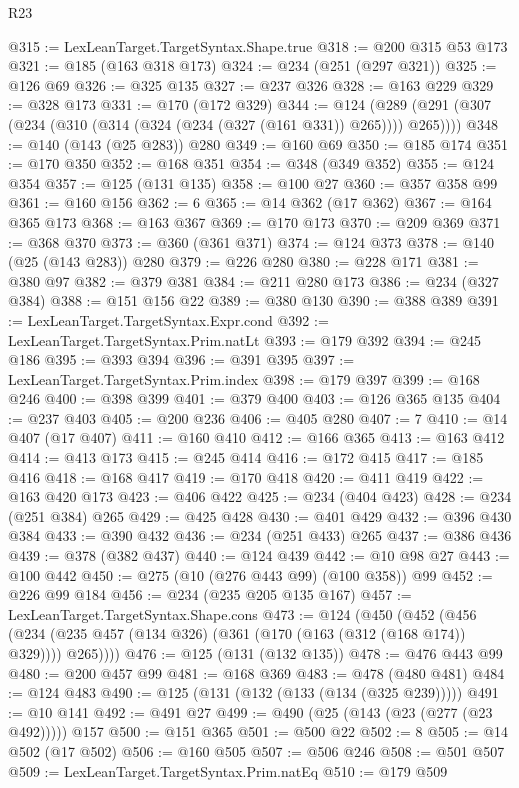 \begin{lexlean}{R23}
\begin{coremodule}
@315 := LexLeanTarget.TargetSyntax.Shape.true
@318 := @200 @315 @53 @173
@321 := @185 (@163 @318 @173)
@324 := @234 (@251 (@297 @321))
@325 := @126 @69
@326 := @325 @135
@327 := @237 @326
@328 := @163 @229
@329 := @328 @173
@331 := @170 (@172 @329)
@344 := @124 (@289 (@291 (@307 (@234 (@310 (@314 (@324 (@234 (@327 (@161 @331)) @265)))) @265))))
@348 := @140 (@143 (@25 @283)) @280
@349 := @160 @69
@350 := @185 @174
@351 := @170 @350
@352 := @168 @351
@354 := @348 (@349 @352)
@355 := @124 @354
@357 := @125 (@131 @135)
@358 := @100 @27
@360 := @357 @358 @99
@361 := @160 @156
@362 := 6
@365 := @14 @362 (@17 @362)
@367 := @164 @365 @173
@368 := @163 @367
@369 := @170 @173
@370 := @209 @369
@371 := @368 @370
@373 := @360 (@361 @371)
@374 := @124 @373
@378 := @140 (@25 (@143 @283)) @280
@379 := @226 @280
@380 := @228 @171
@381 := @380 @97
@382 := @379 @381
@384 := @211 @280 @173
@386 := @234 (@327 @384)
@388 := @151 @156 @22
@389 := @380 @130
@390 := @388 @389
@391 := LexLeanTarget.TargetSyntax.Expr.cond
@392 := LexLeanTarget.TargetSyntax.Prim.natLt
@393 := @179 @392
@394 := @245 @186
@395 := @393 @394
@396 := @391 @395
@397 := LexLeanTarget.TargetSyntax.Prim.index
@398 := @179 @397
@399 := @168 @246
@400 := @398 @399
@401 := @379 @400
@403 := @126 @365 @135
@404 := @237 @403
@405 := @200 @236
@406 := @405 @280
@407 := 7
@410 := @14 @407 (@17 @407)
@411 := @160 @410
@412 := @166 @365
@413 := @163 @412
@414 := @413 @173
@415 := @245 @414
@416 := @172 @415
@417 := @185 @416
@418 := @168 @417
@419 := @170 @418
@420 := @411 @419
@422 := @163 @420 @173
@423 := @406 @422
@425 := @234 (@404 @423)
@428 := @234 (@251 @384) @265
@429 := @425 @428
@430 := @401 @429
@432 := @396 @430 @384
@433 := @390 @432
@436 := @234 (@251 @433) @265
@437 := @386 @436
@439 := @378 (@382 @437)
@440 := @124 @439
@442 := @10 @98 @27
@443 := @100 @442
@450 := @275 (@10 (@276 @443 @99) (@100 @358)) @99
@452 := @226 @99 @184
@456 := @234 (@235 @205 @135 @167)
@457 := LexLeanTarget.TargetSyntax.Shape.cons
@473 := @124
    (@450
      (@452
        (@456 (@234 (@235 @457 (@134 @326) (@361 (@170 (@163 (@312 (@168 @174)) @329)))) @265))))
@476 := @125 (@131 (@132 @135))
@478 := @476 @443 @99
@480 := @200 @457 @99
@481 := @168 @369
@483 := @478 (@480 @481)
@484 := @124 @483
@490 := @125 (@131 (@132 (@133 (@134 (@325 @239)))))
@491 := @10 @141
@492 := @491 @27
@499 := @490 (@25 (@143 (@23 (@277 (@23 @492))))) @157
@500 := @151 @365
@501 := @500 @22
@502 := 8
@505 := @14 @502 (@17 @502)
@506 := @160 @505
@507 := @506 @246
@508 := @501 @507
@509 := LexLeanTarget.TargetSyntax.Prim.natEq
@510 := @179 @509

\end{coremodule}
\end{lexlean}
